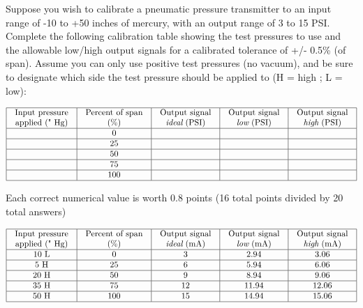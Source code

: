 

Suppose you wish to calibrate a pneumatic pressure transmitter to an input range of -10 to +50 inches of mercury, with an output range of 3 to 15 PSI.  Complete the following calibration table showing the test pressures to use and the allowable low/high output signals for a calibrated tolerance of +/- 0.5\% (of span).  Assume you can only use positive test pressures (no vacuum), and be sure to designate which side the test pressure should be applied to (H = high ; L = low):


$$\vbox{\offinterlineskip
\halign{\strut
\vrule \quad\hfil # \ \hfil & 
\vrule \quad\hfil # \ \hfil & 
\vrule \quad\hfil # \ \hfil & 
\vrule \quad\hfil # \ \hfil & 
\vrule \quad\hfil # \ \hfil \vrule \cr
\noalign{\hrule}
%
Input pressure & Percent of span & Output signal & Output signal & Output signal \cr
%
applied (" Hg) & (\%) & {\it ideal} (PSI) & {\it low} (PSI) & {\it high} (PSI) \cr
%
\noalign{\hrule}
%
 & 0 & & & \cr
%
\noalign{\hrule}
%
 & 25 & & & \cr
%
\noalign{\hrule}
%
 & 50 & & & \cr
%
\noalign{\hrule}
%
 & 75 & & & \cr
%
\noalign{\hrule}
%
 & 100 & & & \cr
%
\noalign{\hrule}
} %
}$$ %

\vskip 10pt

\noindent
Each correct numerical value is worth 0.8 points (16 total points divided by 20 total answers)








$$\vbox{\offinterlineskip
\halign{\strut
\vrule \quad\hfil # \ \hfil & 
\vrule \quad\hfil # \ \hfil & 
\vrule \quad\hfil # \ \hfil & 
\vrule \quad\hfil # \ \hfil & 
\vrule \quad\hfil # \ \hfil \vrule \cr
\noalign{\hrule}
%
Input pressure & Percent of span & Output signal & Output signal & Output signal \cr
%
applied (" Hg) & (\%) & {\it ideal} (mA) & {\it low} (mA) & {\it high} (mA) \cr
%
\noalign{\hrule}
%
10 L & 0 & 3 & 2.94 & 3.06 \cr
%
\noalign{\hrule}
%
5 H & 25 & 6 & 5.94 & 6.06 \cr
%
\noalign{\hrule}
%
20 H & 50 & 9 & 8.94 & 9.06 \cr
%
\noalign{\hrule}
%
35 H & 75 & 12 & 11.94 & 12.06 \cr
%
\noalign{\hrule}
%
50 H & 100 & 15 & 14.94 & 15.06 \cr
%
\noalign{\hrule}
} %
}$$ %










